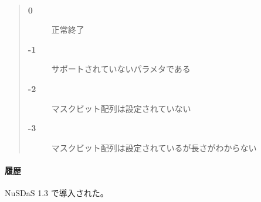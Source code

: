 \paragraph{\ResultCode}
\begin{quote}
\begin{description}
\item[{\bf 0}] 正常終了
\item[{\bf -1}] サポートされていないパラメタである
\item[{\bf -2}] マスクビット配列は設定されていない
\item[{\bf -3}] マスクビット配列は設定されているが長さがわからない
\end{description}\end{quote}

\paragraph{履歴}
NuSDaS 1.3 で導入された。
